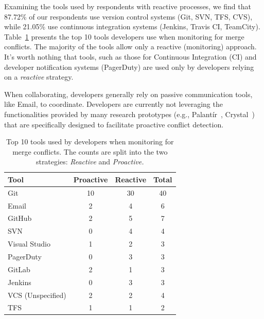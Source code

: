 Examining the tools used by respondents with reactive processes, we find that 87.72\% of our respondents use version control systems (Git, SVN, TFS, CVS), while 21.05\% use continuous integration systems (Jenkins, Travis CI, TeamCity).
Table~\ref{tab:tool-counts} presents the top 10 tools developers use when monitoring for merge conflicts.
The majority of the tools allow only a reactive (monitoring) approach.
It's worth nothing that tools, such as those for Continuous Integration (CI) and developer notification systems (PagerDuty) are used only by developers relying on a \emph{reactive} strategy.

When collaborating, developers generally rely on passive communication tools, like Email, to coordinate.
Developers are currently not leveraging the functionalities provided by many research prototypes (e.g., Palant\'{i}r~\cite{palantir}, Crystal~\cite{Brun2011}) that are specifically designed to facilitate proactive conflict detection.

\begin{table}[hbt]
\caption{Top 10 tools used by developers when monitoring for merge conflicts. The counts are split into the two strategies: \emph{Reactive} and \emph{Proactive.}}
\label{tab:tool-counts}
\centering
\begin{tabular}{lccc}
\toprule
Tool & Proactive & Reactive & Total \\
\midrule
Git					& 10 & 30 & 40 \\
Email				& 2  & 4  & 6  \\
GitHub				& 2  & 5  & 7  \\
SVN					& 0  & 4  & 4  \\
Visual Studio		& 1  & 2  & 3  \\
PagerDuty 		    & 0  & 3  & 3  \\
GitLab				& 2  & 1  & 3  \\
Jenkins				& 0  & 3  & 3  \\
VCS (Unspecified)	& 2  & 2  & 4  \\
TFS					& 1  & 1  & 2  \\
\bottomrule
\end{tabular}	

\end{table}

